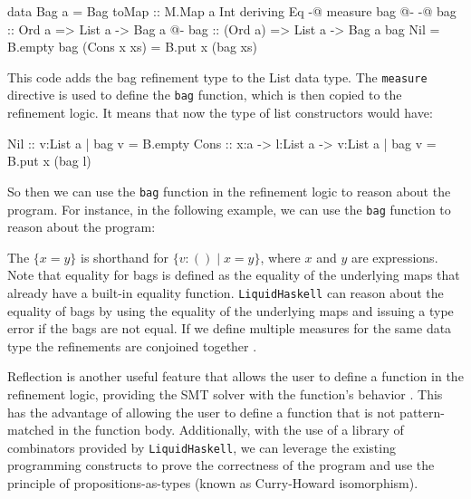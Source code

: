 \documentclass[]{rptuseminar}
\begin{document}
\begin{haskell}
data Bag a = Bag { toMap :: M.Map a Int } deriving Eq
{-@ measure bag @-}
{-@ bag :: Ord a => List a -> Bag a @-}
bag :: (Ord a) => List a -> Bag a
bag Nil = B.empty
bag (Cons x xs) = B.put x (bag xs)
\end{haskell}

This code adds the bag refinement type to the List data type. The \texttt{measure} directive is used to define the \texttt{bag} function,
which is then copied to the refinement logic. It means that now the type of list constructors would have:

\begin{haskell}
Nil  :: {v:List a | bag v = B.empty}
Cons :: x:a -> l:List a -> {v:List a | bag v = B.put x (bag l)}
\end{haskell}

So then we can use the \texttt{bag} function in the refinement logic to reason about the program. 
For instance, in the following example, we can use the \texttt{bag} function to reason about the program:


The $\{x = y\}$ is shorthand for $\{ v : () \mid x = y \}$, where $x$ and $y$ are expressions.
Note that equality for bags is defined as the equality of the underlying maps that already have a built-in equality function.
\texttt{LiquidHaskell} can reason about the equality of bags by using the equality of the underlying maps and issuing a type error if the bags are not equal.
If we define multiple measures for the same data type the refinements are conjoined together \cite{niki_lecture_2024}.



Reflection is another useful feature that allows the user to define a function in the refinement logic, providing
the SMT solver with the function's behavior \cite{vazou_refinement_2018}. 
This has the advantage of allowing the user to define a function that is not pattern-matched in the function body.
Additionally, with the use of a library of combinators provided by \texttt{LiquidHaskell}, we can leverage the existing programming constructs to 
prove the correctness of the program and use the principle of propositions-as-types (known as Curry-Howard isomorphism)\cite{vazou_refinement_2018}\cite{wadler_propositions_2015}.
\end{document}
